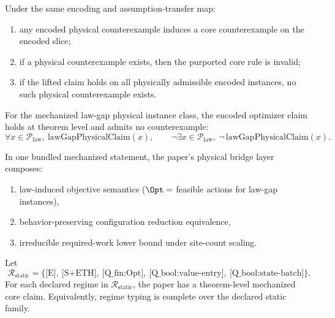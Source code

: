 \begin{corollary}\label{cor:physical-counterexample-core-failure}
Under the same encoding and assumption-transfer map:
\begin{enumerate}
\item any encoded physical counterexample induces a core counterexample on the encoded slice;
\item if a physical counterexample exists, then the purported core rule is invalid;
\item if the lifted claim holds on all physically admissible encoded instances, no such physical counterexample exists.
\end{enumerate}
\end{corollary}

\begin{proposition}\label{prop:law-instance-objective-bridge}
For the mechanized law-gap physical instance class, the encoded optimizer claim holds at theorem level and admits no counterexample:
\[
\forall x\in\mathcal{P}_{\mathrm{law}},\ \mathrm{lawGapPhysicalClaim}(x),
\qquad
\neg\exists x\in\mathcal{P}_{\mathrm{law}},\ \neg\,\mathrm{lawGapPhysicalClaim}(x).
\]
\end{proposition}

\begin{theorem}\label{thm:physical-bridge-bundle}
In one bundled mechanized statement, the paper's physical bridge layer composes:
\begin{enumerate}
\item law-induced objective semantics (\(\Opt=\) feasible actions for law-gap instances),
\item behavior-preserving configuration reduction equivalence,
\item irreducible required-work lower bound under site-count scaling.
\end{enumerate}
\end{theorem}

\begin{theorem}\label{thm:regime-coverage}
Let
\[
\mathcal{R}_{\mathrm{static}} =
\{\text{[E]},\ \text{[S+ETH]},\ \text{[Q\_fin:Opt]},\ \text{[Q\_bool:value-entry]},\ \text{[Q\_bool:state-batch]}\}.
\]
For each declared regime in $\mathcal{R}_{\mathrm{static}}$, the paper has a theorem-level mechanized core claim. Equivalently, regime typing is complete over the declared static family.
\end{theorem}

